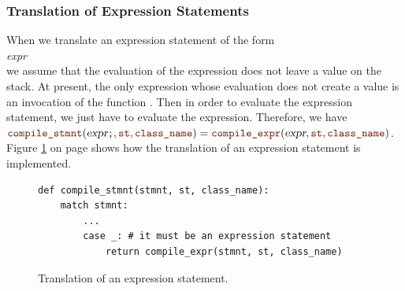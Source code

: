 \subsubsection{Translation of Expression Statements}
When we translate an expression statement of the form
\\[0.2cm]
\hspace*{1.3cm}
\textsl{expr} \mytt{;}
\\[0.2cm]
we assume that the evaluation of the expression does not leave a value on the stack.
At present, the only expression whose evaluation does not create a value is an invocation of the function
.  Then in order to evaluate the expression statement, we just have to evaluate the expression.
Therefore, we have
\\[0.2cm]
\hspace*{1.3cm}
$\mytt{compile\_stmnt}(\textsl{expr}\mytt{;}, \mytt{st}, \mytt{class\_name})
=  \mytt{compile\_expr}(\textsl{expr}, \mytt{st}, \mytt{class\_name})$.
\\[0.2cm]
Figure \ref{fig:Compiler.ipynb:compile:expr_stmnt} on page \pageref{fig:Compiler.ipynb:compile:expr_stmnt} shows how the
translation of an expression statement is implemented.

\begin{figure}[!ht]
\centering
\begin{verbatim}
def compile_stmnt(stmnt, st, class_name):
    match stmnt:
        ...
        case _: # it must be an expression statement
            return compile_expr(stmnt, st, class_name)
\end{verbatim}
\vspace*{-0.3cm}
\caption{Translation of an expression statement.}
\label{fig:Compiler.ipynb:compile:expr_stmnt}
\end{figure}


